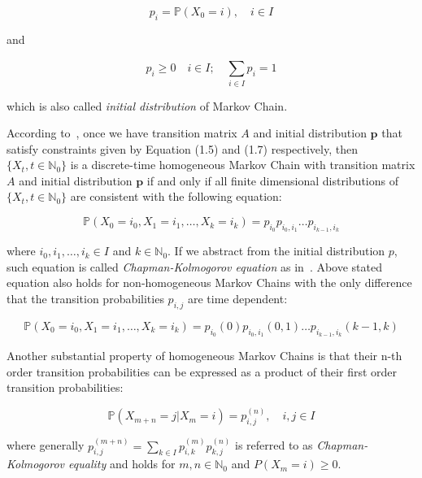 \begin{equation}
p_i = \mathbb{P}(X_0=i), \quad i \in I
\end{equation}

and 

\begin{equation}
p_i \geq 0 \quad i \in I; \quad \sum\limits_{i \in I} ^{}p_i = 1
\end{equation}

which is also called \textit{initial distribution} of Markov Chain.

According to~\citep{Praskova2012}, once we have transition matrix $A$ and initial distribution $\textbf{p}$ that satisfy constraints given by Equation (1.5) and (1.7) respectively,
then $\{X_t,t \in \mathbb{N}_0\}$ is a discrete-time homogeneous Markov Chain with transition matrix $A$ and initial distribution $\textbf{p}$ 
if and only if all finite dimensional distributions of $\{X_t,t \in \mathbb{N}_0\}$ are consistent with the following equation:

\begin{equation}
    \mathbb{P}(X_{0}=i_0,X_{1}=i_1,\ldots,X_{k}=i_k) = p_{i_0} p_{i_0,i_1} \ldots p_{i_{k-1},i_k}
\end{equation}

where $i_0,i_1,\ldots,i_k \in I$ and $k \in \mathbb{N}_0$. If we abstract from the initial distribution $p$, such equation is called \textit{Chapman-Kolmogorov equation} as in~\citep{Yin2004}.
Above stated equation also holds for non-homogeneous Markov Chains with the only difference that the transition probabilities $p_{i,j}$ are time dependent:

\begin{equation}
    \mathbb{P}(X_{0}=i_0,X_{1}=i_1,\ldots,X_{k}=i_k) = p_{i_0}(0) p_{i_0,i_1}(0,1) \ldots p_{i_{k-1},i_k}(k-1,k)
\end{equation}

Another substantial property of homogeneous Markov Chains is that their n-th order transition probabilities can be expressed as a product of their first order transition probabilities:

\begin{equation}
    \mathbb{P}(X_{m+n} = j|X_{m} = i) = p_{i,j}^{(n)}, \quad i,j \in I
\end{equation}

where generally $p_{i,j}^{(m+n)} = \sum\limits_{k \in I} p_{i,k}^{(m)} p_{k,j}^{(n)}$ is referred to as \textit{Chapman-Kolmogorov equality} and holds for $m,n \in \mathbb{N}_0$ and $P(X_m=i) \geq 0$. \citep{Praskova2012}

